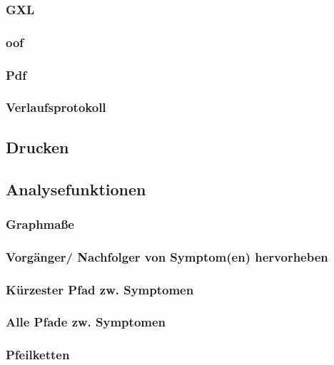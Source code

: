 \documentclass[enabledeprecatedfontcommands,fontsize=11pt,paper=a4,twoside]{scrartcl}
\newcounter{one}
\begin{document}
							\newpage
		\subsubsection{GXL}
		
							\newpage
		\subsubsection{oof}
		
							\newpage
		\subsubsection{Pdf}
		
		
		
		
							\newpage
		\subsubsection{Verlaufsprotokoll}
	\subsection{Drucken} \label{print}
	\subsection{Analysefunktionen} \label{analyse}
		\subsubsection{Graphmaße} 
		\subsubsection{Vorgänger/ Nachfolger von Symptom(en) hervorheben}
		\subsubsection{Kürzester Pfad zw. Symptomen}
		\subsubsection{Alle Pfade zw. Symptomen}
		\subsubsection{Pfeilketten}
\end{document}
